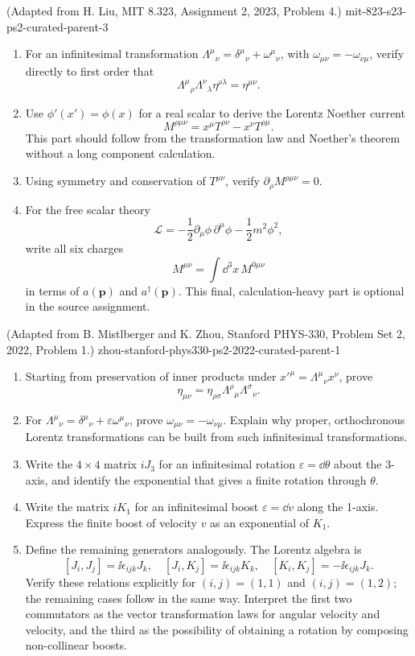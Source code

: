 \begin{enumerate}
  {(Adapted from H. Liu, MIT 8.323, Assignment 2, 2023, Problem 4.)}
  {mit-823-s23-ps2-curated-parent-3}
\begin{enumerate}
\item
For an infinitesimal transformation
\(\Lambda^\mu{}_\nu=\delta^\mu{}_\nu+\omega^\mu{}_\nu\), with
\(\omega_{\mu\nu}=-\omega_{\nu\mu}\), verify directly to first order
that
\[
 \Lambda^\mu{}_\rho\Lambda^\nu{}_\lambda\eta^{\rho\lambda}
 =\eta^{\mu\nu}.
\]
\item
Use \(\phi'(x')=\phi(x)\) for a real scalar to derive the Lorentz
Noether current
\[
 M^{\rho\mu\nu}
 =x^\mu T^{\rho\nu}-x^\nu T^{\rho\mu}.
\]
This part should follow from the transformation law and Noether's
theorem without a long component calculation.
\item
Using symmetry and conservation of \(T^{\mu\nu}\), verify
\(\partial_\rho M^{\rho\mu\nu}=0\).
\item
For the free scalar theory
\[
 \mathcal L=-\frac12\partial_\mu\phi\,\partial^\mu\phi
 -\frac12m^2\phi^2,
\]
write all six charges
\[
 M^{\mu\nu}=\int \dd^3x\,M^{0\mu\nu}
\]
in terms of \(a(\mathbf p)\) and \(a^\dagger(\mathbf p)\).  This final,
calculation-heavy part is optional in the source assignment.
\end{enumerate}

  {(Adapted from B. Mistlberger and K. Zhou, Stanford PHYS-330, Problem Set 2, 2022, Problem 1.)}
  {zhou-stanford-phys330-ps2-2022-curated-parent-1}
\begin{enumerate}
\item
Starting from preservation of inner products under
\(x'^\mu=\Lambda^\mu{}_\nu x^\nu\), prove
\[
 \eta_{\mu\nu}
 =\eta_{\rho\sigma}\Lambda^\rho{}_\mu\Lambda^\sigma{}_\nu.
\]
\item
For \(\Lambda^\mu{}_\nu
=\delta^\mu{}_\nu+\varepsilon\omega^\mu{}_\nu\), prove
\(\omega_{\mu\nu}=-\omega_{\nu\mu}\).  Explain why proper,
orthochronous Lorentz transformations can be built from such
infinitesimal transformations.
\item
Write the \(4\times4\) matrix \(iJ_3\) for an infinitesimal rotation
\(\varepsilon=\dd\theta\) about the 3-axis, and identify the exponential
that gives a finite rotation through \(\theta\).
\item
Write the matrix \(iK_1\) for an infinitesimal boost
\(\varepsilon=\dd v\) along the 1-axis.  Express the finite boost of
velocity \(v\) as an exponential of \(K_1\).
\item
Define the remaining generators analogously.  The Lorentz algebra is
\[
 [J_i,J_j]=\ii\epsilon_{ijk}J_k,\quad
 [J_i,K_j]=\ii\epsilon_{ijk}K_k,\quad
 [K_i,K_j]=-\ii\epsilon_{ijk}J_k.
\]
Verify these relations explicitly for \((i,j)=(1,1)\) and
\((i,j)=(1,2)\); the remaining cases follow in the same way.  Interpret
the first two commutators as the vector transformation laws for angular
velocity and velocity, and the third as the possibility of obtaining a
rotation by composing non-collinear boosts.
\end{enumerate}


\end{enumerate}
